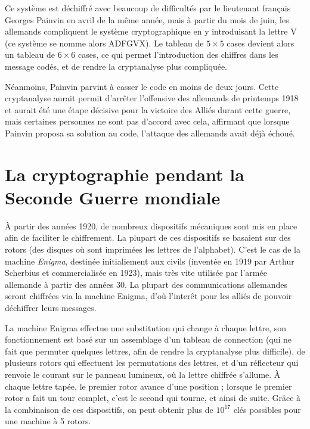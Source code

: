Ce système est déchiffré avec beaucoup de difficultés par le
lieutenant français Georges Painvin en avril de la même année, mais à
partir du mois de juin, les allemands compliquent le système
cryptographique en y introduisant la lettre V (ce système se nomme
alors ADFGVX). Le tableau de $5\times 5$ cases devient alors un tableau
de $6\times 6$ cases, ce qui permet l'introduction des chiffres dans
les message codés, et de rendre la cryptanalyse plus
compliquée.

Néanmoins, Painvin parvint à casser le code en moins de
deux jours. Cette cryptanalyse aurait permit d'arrêter l'offensive
des allemands de printemps 1918 et aurait été une étape décisive pour
la victoire des Alliés durant cette guerre, mais certaines personnes
ne sont pas d'accord avec cela, affirmant que lorsque Painvin proposa
sa solution au code, l'attaque des allemands avait déjà échoué. 
\section{La cryptographie pendant la Seconde Guerre mondiale}
À partir des années 1920, de nombreux dispositifs mécaniques sont mis
en place afin de faciliter le chiffrement. La plupart de ces
dispositifs se basaient sur des rotors (des disques où sont imprimées
les lettres de l'alphabet). C'est le cas de la machine \emph{Enigma},
destinée initialiement aux civils (inventée en 1919 par Arthur
Scherbius et commercialisée en 1923), mais très vite utilisée par
l'armée allemande à partir des années 30. La plupart des
communications allemandes seront chiffrées via la machine Enigma, d'où
l'interêt pour les alliés de pouvoir déchiffrer leurs messages.

La machine Enigma effectue une substitution qui change à chaque
lettre, son fonctionnement est basé sur un assemblage d'un tableau de
connection (qui ne fait que permuter quelques lettres, afin de rendre
la cryptanalyse plus difficile), de plusieurs rotors qui effectuent
les permutations des lettres, et d'un réflecteur qui renvoie le courant
sur le panneau lumineux, où la lettre chiffrée s'allume. À chaque
lettre tapée, le premier rotor avance d'une position ; lorsque le
premier rotor a fait un tour complet, c'est le second qui tourne, et
ainsi de suite. Grâce à la combinaison de ces dispositifs, on peut
obtenir plus de $10^{17}$ clés possibles pour une machine à 5 rotors.

